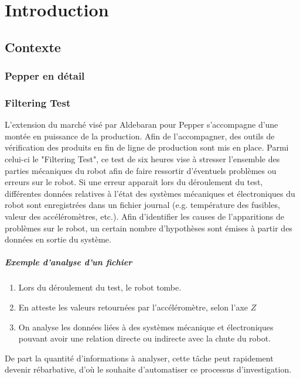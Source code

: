 \chapter{Introduction}
\label{Introduction}
\thispagestyle{fancy}

\section{Contexte}
\label{Introduction:Contexte}

\subsection{Pepper en détail}
\subsection{Filtering Test}
\label{Introduction:Contexte:Filtering Test}
L'extension du marché visé par Aldebaran pour Pepper s'accompagne d'une montée en puissance de la production. Afin de l'accompagner, des outils de vérification des produits en fin de ligne de production sont mis en place. Parmi celui-ci le "Filtering Test", ce test de six heures vise à stresser l'ensemble des parties mécaniques du robot afin de faire ressortir d'éventuels problèmes ou erreurs sur le robot. Si une erreur apparait lors du déroulement du test, différentes données relatives à l'état des systèmes mécaniques et électroniques du robot sont enregistrées dans un fichier journal (e.g. température des fusibles, valeur des accéléromètres, etc.). Afin d'identifier les causes de l'apparitions de problèmes sur le robot, un certain nombre d'hypothèses sont émises à partir des données en sortie du système. 

\paragraph{Exemple d'analyse d'un fichier}
\begin{enumerate}
	\item Lors du déroulement du test, le robot tombe.
	\item En atteste les valeurs retournées par l'accéléromètre, selon l'axe $Z$
	\item On analyse les données liées à des systèmes mécanique et électroniques pouvant avoir une relation directe ou indirecte avec la chute du robot.  
\end{enumerate}


De part la quantité d'informations à analyser, cette tâche peut rapidement devenir rébarbative, d'où le souhaite d'automatiser ce processus d'investigation.

